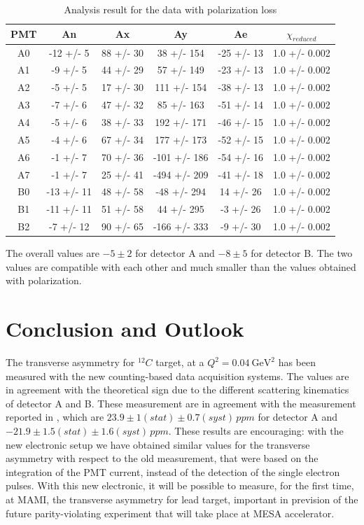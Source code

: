 \begin{table}[h]
\centering
\begin{tabular}{c|c|c|c|c|c}
\hline
 PMT   & An         & Ax        & Ay           & Ae         & $\chi _{reduced}$   \\
\hline
 A0    & -12 +/- 5  & 88 +/- 30 & 38 +/- 154   & -25 +/- 13 & 1.0 +/- 0.002   \\
 A1    & -9 +/- 5   & 44 +/- 29 & 57 +/- 149   & -23 +/- 13 & 1.0 +/- 0.002   \\
 A2    & -5 +/- 5   & 17 +/- 30 & 111 +/- 154  & -38 +/- 13 & 1.0 +/- 0.002   \\
 A3    & -7 +/- 6   & 47 +/- 32 & 85 +/- 163   & -51 +/- 14 & 1.0 +/- 0.002   \\
 A4    & -5 +/- 6   & 38 +/- 33 & 192 +/- 171  & -46 +/- 15 & 1.0 +/- 0.002   \\
 A5    & -4 +/- 6   & 67 +/- 34 & 177 +/- 173  & -52 +/- 15 & 1.0 +/- 0.002   \\
 A6    & -1 +/- 7   & 70 +/- 36 & -101 +/- 186 & -54 +/- 16 & 1.0 +/- 0.002   \\
 A7    & -1 +/- 7   & 25 +/- 41 & -494 +/- 209 & -41 +/- 18 & 1.0 +/- 0.002   \\
 B0    & -13 +/- 11 & 48 +/- 58 & -48 +/- 294  & 14 +/- 26  & 1.0 +/- 0.002   \\
 B1    & -11 +/- 11 & 51 +/- 58 & 44 +/- 295   & -3 +/- 26  & 1.0 +/- 0.002   \\
 B2    & -7 +/- 12  & 90 +/- 65 & -166 +/- 333 & -9 +/- 30  & 1.0 +/- 0.002   \\
\hline
\end{tabular}
\caption{Analysis result for the data with polarization loss}
\label{tab:PolTab}
\end{table}

The overall values are $-5 \pm 2$ for detector A and $-8 \pm 5$ for detector B. The two values are compatible with each other and much smaller than the values obtained with polarization.

\section{Conclusion and Outlook} 

The transverse asymmetry for $^{12}C$ target, at a $Q^{2} = \SI{0.04}{\giga \electronvolt \squared}$ has been measured with the new counting-based data acquisition systems. The values are in agreement with the theoretical sign due to the different scattering kinematics of detector A and B. These measurement are in agreement with the measurement reported in \cite{Esser:2018vdp}, which are $23.9  \pm 1 (stat) \pm 0.7 (syst)  \, ppm$ for detector A and $ -21.9 \pm 1.5 (stat) \pm 1.6 (syst) \, ppm$.
These results are encouraging: with the new electronic setup we have obtained similar values for the transverse asymmetry with respect to the old measurement, that were based on the integration of the PMT current, instead of the detection of the single electron pulses. With this new electronic, it will be possible to measure, for the first time, at MAMI, the transverse asymmetry for lead target, important in prevision of the future parity-violating experiment that will take place at MESA accelerator.